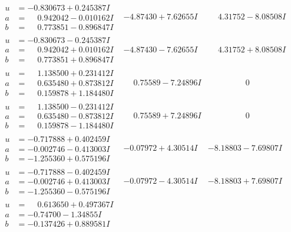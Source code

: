 \documentclass[1p]{elsarticle_modified}
\theoremstyle{definition}
\begin{document}
$$\begin{array}{c|c|c}
\begin{aligned}
u &= -0.830673 + 0.245387 I \\
a &= \phantom{-}0.942042 - 0.010162 I \\
b &= \phantom{-}0.773851 - 0.896847 I\end{aligned}
 & -4.87430 + 7.62655 I & \phantom{-}4.31752 - 8.08508 I \\ \hline\begin{aligned}
u &= -0.830673 - 0.245387 I \\
a &= \phantom{-}0.942042 + 0.010162 I \\
b &= \phantom{-}0.773851 + 0.896847 I\end{aligned}
 & -4.87430 - 7.62655 I & \phantom{-}4.31752 + 8.08508 I \\ \hline\begin{aligned}
u &= \phantom{-}1.138500 + 0.231412 I \\
a &= \phantom{-}0.635480 + 0.873812 I \\
b &= \phantom{-}0.159878 + 1.184480 I\end{aligned}
 & \phantom{-}0.75589 - 7.24896 I & \phantom{-0.000000 } 0 \\ \hline\begin{aligned}
u &= \phantom{-}1.138500 - 0.231412 I \\
a &= \phantom{-}0.635480 - 0.873812 I \\
b &= \phantom{-}0.159878 - 1.184480 I\end{aligned}
 & \phantom{-}0.75589 + 7.24896 I & \phantom{-0.000000 } 0 \\ \hline\begin{aligned}
u &= -0.717888 + 0.402459 I \\
a &= -0.002746 - 0.413003 I \\
b &= -1.255360 + 0.575196 I\end{aligned}
 & -0.07972 + 4.30514 I & -8.18803 - 7.69807 I \\ \hline\begin{aligned}
u &= -0.717888 - 0.402459 I \\
a &= -0.002746 + 0.413003 I \\
b &= -1.255360 - 0.575196 I\end{aligned}
 & -0.07972 - 4.30514 I & -8.18803 + 7.69807 I \\ \hline\begin{aligned}
u &= \phantom{-}0.613650 + 0.497367 I \\
a &= -0.74700 - 1.34855 I \\
b &= -0.137426 + 0.889581 I\end{aligned}

\end{array}$$
\end{document}

